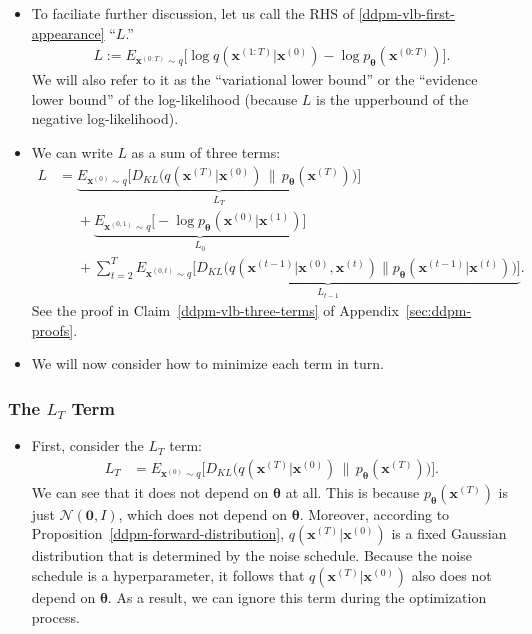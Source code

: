 \documentclass[10pt]{article}
\newcommand{\ve}[1]{\mathbf{#1}}
\newcommand{\ves}[1]{\boldsymbol{#1}}
\begin{document}
\begin{itemize}
\item To faciliate further discussion, let us call the RHS of \eqref{ddpm-vlb-first-appearance} ``$L$.''
\begin{align}
  L := E_{\ve{x}^{(0:T)} \sim q}\Big[ \log q(\ve{x}^{(1:T)}|\ve{x}^{(0)}) - \log p_{\ves{\theta}}(\ve{x}^{(0:T)}) \Big]. \label{ddpm-vlb}
\end{align}
We will also refer to it as the ``variational lower bound'' or the ``evidence lower bound'' of the log-likelihood (because $L$ is the upperbound of the negative log-likelihood).

\item We can write $L$ as a sum of three terms:
\begin{align*}
  L
  &= \underbrace{E_{\ve{x}^{(0)} \sim q} \Big[ D_{KL}\big(q(\ve{x}^{(T)}|\ve{x}^{(0)})\, \big\|\, p_{\ves{\theta}}(\ve{x}^{(T)})\big) \Big]}_{L_T} \\
  &\phantom{=} + \underbrace{E_{\ve{x}^{(0,1)} \sim q} \bigg[ - \log p_{\ves{\theta}}(\ve{x}^{(0)}|\ve{x}^{(1)}) \bigg] }_{L_0} \\
  &\phantom{=} + \sum_{t = 2}^T \underbrace{E_{\ve{x}^{(0,t)}\sim q} \Big[ D_{KL}\big( q(\ve{x}^{(t-1)}|\ve{x}^{(0)},\ve{x}^{(t)})  \big\| p_{\ves{\theta}}(\ve{x}^{(t-1)}|\ve{x}^{(t)}) \big) \Big]}_{L_{t-1}}.
\end{align*}
See the proof in Claim~\ref{ddpm-vlb-three-terms} of Appendix~\ref{sec:ddpm-proofs}.

\item We will now consider how to minimize each term in turn.
\end{itemize}

\subsubsection{The $L_T$ Term}
\begin{itemize}
\item First, consider the $L_T$ term:
\begin{align*}
  L_T 
  &= E_{\ve{x}^{(0)} \sim q} \Big[ D_{KL}\big(q(\ve{x}^{(T)}|\ve{x}^{(0)})\, \big\|\, p_{\ves{\theta}}(\ve{x}^{(T)})\big) \Big].
\end{align*}
We can see that it does not depend on $\ves{\theta}$ at all. This is because $p_{\ves{\theta}}(\ve{x}^{(T)})$ is just $\mathcal{N}(\ve{0},I)$, which does not depend on $\ves{\theta}$. Moreover, according to Proposition~\ref{ddpm-forward-distribution}, $q(\ve{x}^{(T)}|\ve{x}^{(0)})$ is a fixed Gaussian distribution that is determined by the noise schedule. Because the noise schedule is a hyperparameter, it follows that $q(\ve{x}^{(T)}|\ve{x}^{(0)})$ also does not depend on $\ves{\theta}$. As a result, we can ignore this term during the optimization process.
\end{itemize}
\end{document}

